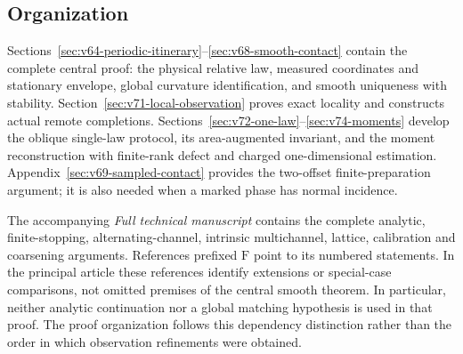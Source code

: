 \subsection{Organization}

Sections~\ref{sec:v64-periodic-itinerary}--\ref{sec:v68-smooth-contact}
contain the complete central proof: the physical relative law, measured
coordinates and stationary envelope, global curvature identification,
and smooth uniqueness with stability.  Section~\ref{sec:v71-local-observation}
proves exact locality and constructs actual remote completions.
Sections~\ref{sec:v72-one-law}--\ref{sec:v74-moments} develop the
oblique single-law protocol, its area-augmented invariant, and the
moment reconstruction with finite-rank defect and charged
one-dimensional estimation.  Appendix~\ref{sec:v69-sampled-contact}
provides the two-offset finite-preparation argument; it is also needed
when a marked phase has normal incidence.

The accompanying \emph{Full technical manuscript} contains the complete
analytic, finite-stopping, alternating-channel, intrinsic multichannel,
lattice, calibration and coarsening arguments.  References prefixed
$\mathrm F$ point to its numbered statements.  In the principal article
these references identify extensions or special-case comparisons, not
omitted premises of the central smooth theorem.  In particular, neither
analytic continuation nor a global matching hypothesis is used in that
proof.  The proof organization follows this dependency distinction rather
than the order in which observation refinements were obtained.
